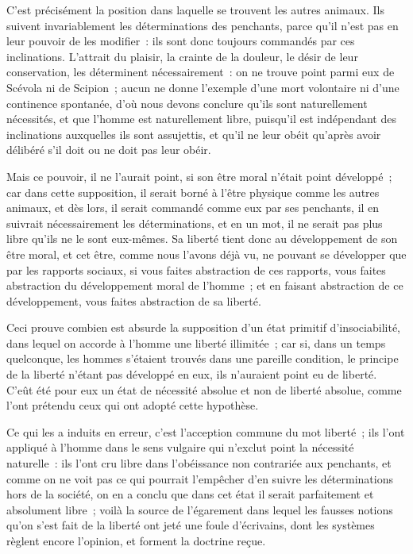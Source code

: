 \documentclass[french,twoside]{book} %
\begin{document}
C’est précisément la position dans laquelle se trouvent les autres animaux. Ils suivent invariablement les déterminations des penchants, parce qu’il n’est pas en leur pouvoir de les modifier : ils sont donc toujours commandés par ces inclinations. L’attrait du plaisir, la crainte de la douleur, le désir de leur conservation, les déterminent nécessairement : on ne trouve point parmi eux de Scévola ni de Scipion ; aucun ne donne l’exemple d’une mort volontaire ni d’une continence spontanée, d’où nous devons conclure qu’ils sont naturellement nécessités, et que l’homme est naturellement libre, puisqu’il est indépendant des inclinations auxquelles ils sont assujettis, et qu’il ne leur obéit qu’après avoir délibéré s’il doit ou ne doit pas leur obéir.\par
Mais ce pouvoir, il ne l’aurait point, si son être moral n’était point développé ; car dans cette supposition, il serait borné à l’être physique comme les autres animaux, et dès lors, il serait commandé comme eux par ses penchants, il en suivrait nécessairement les déterminations, et en un mot, il ne serait pas plus libre qu’ils ne le sont eux-mêmes. Sa liberté tient donc au développement de son être moral, et cet être, comme nous l’avons déjà vu, ne pouvant se développer que par les rapports sociaux, si vous faites abstraction de ces rapports, vous faites abstraction du développement moral de l’homme ; et en faisant abstraction de ce développement, vous faites abstraction de sa liberté.\par
Ceci prouve combien est absurde la supposition d’un état primitif d’insociabilité, dans lequel on accorde à l’homme une liberté illimitée ; car si, dans un temps quelconque, les hommes s’étaient trouvés dans une pareille condition, le principe de la liberté n’étant pas développé en eux, ils n’auraient point eu de liberté. C’eût été pour eux un état de nécessité absolue et non de liberté absolue, comme l’ont prétendu ceux qui ont adopté cette hypothèse.\par
Ce qui les a induits en erreur, c’est l’acception commune du mot liberté ; ils l’ont appliqué à l’homme dans le sens vulgaire qui n’exclut point la nécessité naturelle : ils l’ont cru libre dans l’obéissance non contrariée aux penchants, et comme on ne voit pas ce qui pourrait l’empêcher d’en suivre les déterminations hors de la société, on en a conclu que dans cet état il serait parfaitement et absolument libre ; voilà la source de l’égarement dans lequel les fausses notions qu’on s’est fait de la liberté ont jeté une foule d’écrivains, dont les systèmes règlent encore l’opinion, et forment la doctrine reçue.\par
\end{document}
